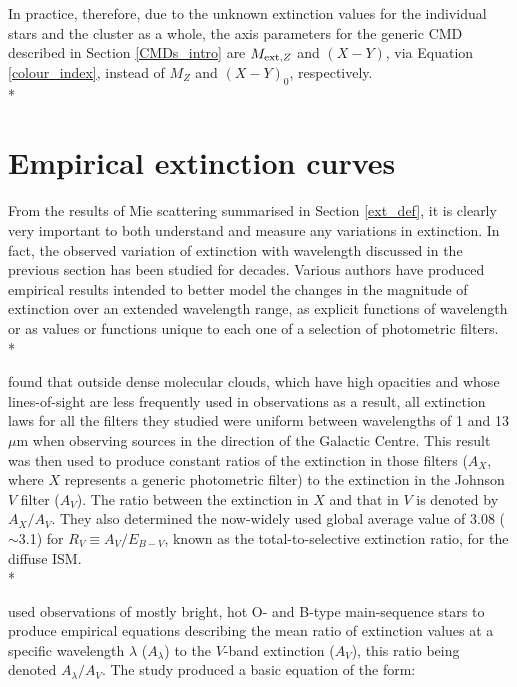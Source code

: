\documentclass[12pt, a4paper]{report}
\begin{document}
In practice, therefore, due to the unknown extinction values for the individual stars and the cluster as a whole, the axis parameters for the generic CMD described in Section \ref{CMDs_intro} are $M_{\textnormal{ext},Z}$ and $(X-Y)$, via Equation \ref{colour_index}, instead of $M_{Z}$ and $(X-Y)_{0}$, respectively.\\*

\section{Empirical extinction curves} \label{empirical}

From the results of Mie scattering summarised in Section \ref{ext_def}, it is clearly very important to both understand and measure any variations in extinction. In fact, the observed variation of extinction with wavelength discussed in the previous section has been studied for decades. Various authors have produced empirical results intended to better model the changes in the magnitude of extinction over an extended wavelength range, as explicit functions of wavelength or as values or functions unique to each one of a selection of photometric filters.\\*


\cite{1985ApJ...288..618R} found that outside dense molecular clouds, which have high opacities and whose lines-of-sight are less frequently used in observations as a result, all extinction laws for all the filters they studied were uniform between wavelengths of 1 and 13 $\mu$m when observing sources in the direction of the Galactic Centre. This result was then used to produce constant ratios of the extinction in those filters ($A_{X}$, where $X$ represents a generic photometric filter) to the extinction in the Johnson $V$ filter ($A_{V}$). The ratio between the extinction in $X$ and that in $V$ is denoted by $A_{X}/A_{V}$. They also determined the now-widely used global average value of 3.08 ($\sim$3.1) for $R_{V} \equiv A_{V}/E_{B-V}$, known as the total-to-selective extinction ratio,  for the diffuse ISM. \\*

\cite{1989ApJ...345..245C} used observations of mostly bright, hot O- and B-type main-sequence stars to produce empirical equations describing the mean ratio of extinction values at a specific wavelength $\lambda$ ($A_{\lambda}$) to the $V$-band extinction ($A_{V}$), this ratio being denoted $A_{\lambda}/A_{V}$. The study produced a basic equation of the form:
\end{document}

